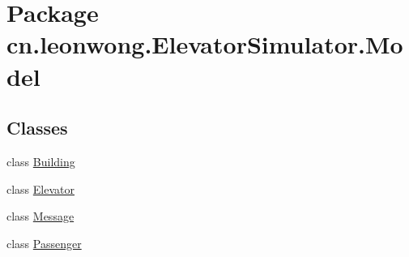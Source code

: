 \hypertarget{namespacecn_1_1leonwong_1_1_elevator_simulator_1_1_model}{}\section{Package cn.\+leonwong.\+Elevator\+Simulator.\+Model}
\label{namespacecn_1_1leonwong_1_1_elevator_simulator_1_1_model}
\subsection*{Classes}
\begin{DoxyCompactItemize}
\item 
class \hyperlink{classcn_1_1leonwong_1_1_elevator_simulator_1_1_model_1_1_building}{Building}
\item 
class \hyperlink{classcn_1_1leonwong_1_1_elevator_simulator_1_1_model_1_1_elevator}{Elevator}
\item 
class \hyperlink{classcn_1_1leonwong_1_1_elevator_simulator_1_1_model_1_1_message}{Message}
\item 
class \hyperlink{classcn_1_1leonwong_1_1_elevator_simulator_1_1_model_1_1_passenger}{Passenger}
\end{DoxyCompactItemize}

